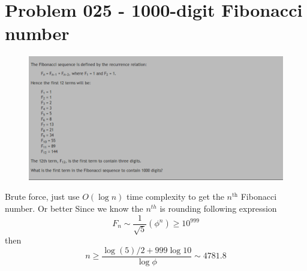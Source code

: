 \section{Problem 025 - 1000-digit Fibonacci number}
\begin{prob}
	\begin{figure}[htb!]
		\begin{center}
			\includegraphics[scale = 0.4]{pic/025.png}
		\end{center}
	\end{figure}
\end{prob}
\begin{sol}
Brute force, just use $O(\log n)$ time complexity to get the $n^{\mathrm{th}}$ Fibonacci number. Or better
Since we know the $n^{th}$ is rounding following expression
\begin{equation}
F_n \sim \dfrac{1}{\sqrt{5}}(\phi^n)\ge 10^{999}
\end{equation}
then 
$$n \ge \dfrac{\log(5)/2 + 999 \log 10}{\log \phi} \sim 4781.8$$
\end{sol}